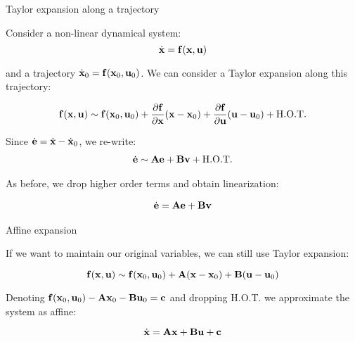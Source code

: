 \documentclass{beamer}
\begin{document}
\begin{frame}{Taylor expansion along a trajectory}
	\begin{flushleft}
		
		Consider a non-linear dynamical system:
		\begin{equation}
			\dot{\mathbf{x}} = \mathbf{f}(\mathbf{x}, \mathbf{u})
		\end{equation}
		
		and a trajectory $\dot{\mathbf{x}}_0 = \mathbf{f}(\mathbf{x}_0, \mathbf{u}_0)$. We can consider a Taylor expansion along this trajectory:
		
		\begin{equation}
			\mathbf{f}(\mathbf{x}, \mathbf{u}) 	\sim \mathbf{f}(\mathbf{x}_0, \mathbf{u}_0) +
			\frac{\partial \mathbf{f}}{\partial \mathbf{x}} (\mathbf{x} - \mathbf{x}_0) + 
			\frac{\partial \mathbf{f}}{\partial \mathbf{u}} (\mathbf{u} - \mathbf{u}_0) + \text{H.O.T.}
		\end{equation}
		
		Since $\dot{\mathbf{e}} = \dot{\mathbf{x}} - \dot{\mathbf{x}}_0$, we re-write:
		\begin{align}
			\dot{\mathbf{e}} \sim 
			\mathbf{A} \mathbf{e} + 
			\mathbf{B} \mathbf{v} + \text{H.O.T.}
		\end{align}		
		
		As before, we drop higher order terms and obtain linearization:
		
		\begin{align}
			\dot{\mathbf{e}} = 
			\mathbf{A} \mathbf{e} + 
			\mathbf{B} \mathbf{v}
		\end{align}		
	
	\end{flushleft}
\end{frame}




\begin{frame}{Affine expansion}
	\begin{flushleft}
		
		If we want to maintain our original variables, we can still use Taylor expansion:
		
		\begin{equation}
			\mathbf{f}(\mathbf{x}, \mathbf{u}) 	\sim \mathbf{f}(\mathbf{x}_0, \mathbf{u}_0) +
			\mathbf{A} (\mathbf{x} - \mathbf{x}_0) + 
			\mathbf{B} (\mathbf{u} - \mathbf{u}_0)
		\end{equation}
		
		Denoting $ \mathbf{f}(\mathbf{x}_0, \mathbf{u}_0) - \mathbf{A}\mathbf{x}_0 - \mathbf{B} \mathbf{u}_0 = \mathbf{c}$ and dropping H.O.T. we approximate the system as affine:
		
		\begin{equation}
			\dot{\mathbf{x}} = \mathbf{A} \mathbf{x} + 
			\mathbf{B} \mathbf{u} + \mathbf{c}
		\end{equation}
		
		
	\end{flushleft}
\end{frame}
\end{document}
